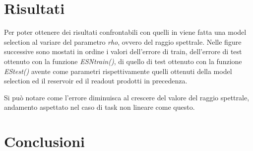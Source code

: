 \section{Risultati}
Per poter ottenere dei risultati confrontabili con quelli in \cite{Markovianfactor:paper} viene fatta una model selection al variare del parametro \textit{rho}, ovvero del raggio spettrale. Nelle figure successive sono mostati in ordine i valori dell'errore di train, dell'errore di test ottenuto con la funzione \textit{ESNtrain()}, di quello di test ottenuto con la funzione \textit{EStest()} avente come parametri rispettivamente quelli ottenuti della model selection ed il reservoir ed il readout prodotti in precedenza.

Si può notare come l'errore diminuisca al crescere del valore del raggio spettrale, andamento aspettato nel caso di task non lineare come questo.



\section{Conclusioni}



